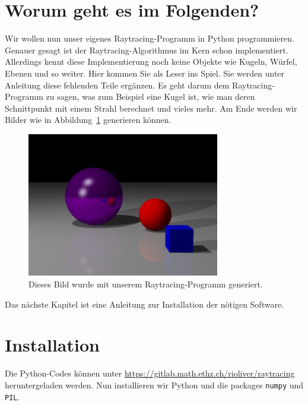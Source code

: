 \documentclass[12pt,a4paper]{article}
\theoremstyle{definition}
\theoremstyle{definition}
\begin{document}
\section{Worum geht es im Folgenden?}
Wir wollen nun unser eigenes Raytracing-Programm in Python programmieren.
Genauer gesagt ist der Raytracing-Algorithmus im Kern schon implementiert.
Allerdings kennt diese Implementierung noch keine Objekte wie Kugeln, Würfel, Ebenen und so weiter.
Hier kommen Sie als Leser ins Spiel.
Sie werden unter Anleitung diese fehlenden Teile ergänzen.
Es geht darum dem Raytracing-Programm zu sagen, was zum Beispiel eine Kugel ist, wie man deren Schnittpunkt mit einem Strahl berechnet und vieles mehr.
Am Ende werden wir Bilder wie in Abbildung~\ref{fig:goal} generieren können.
\begin{figure}[h!]
	\centering
	\includegraphics[width=0.75\textwidth]{images/outlook.png}
	\caption{Dieses Bild wurde mit unserem Raytracing-Programm generiert.}
	\label{fig:goal}
\end{figure}
Das nächste Kapitel ist eine Anleitung zur Installation der nötigen Software.

\section{Installation}
Die Python-Codes können unter \url{https://gitlab.math.ethz.ch/rioliver/raytracing} heruntergeladen werden.
Nun installieren wir Python und die packages \texttt{numpy} und \texttt{PIL}.
\end{document}
